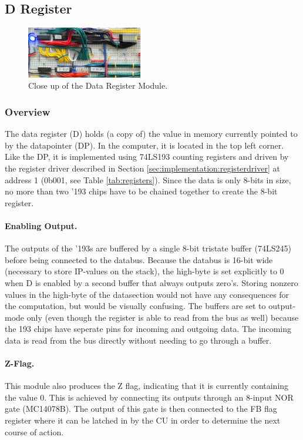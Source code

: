 
\subsection{D Register}
\begin{figure}[H]
  \centering
  \includegraphics[width=0.45\textwidth]{img/dregistercloseup}
  \caption{Close up of the Data Register Module.}
  \label{fig:dregcloseup}
\end{figure}

\subsubsection{Overview}
The data register (D) holds (a copy of) the value in memory currently pointed to by the datapointer (DP). In the computer, it is located in the top left corner. Like the DP, it is implemented using 74LS193 counting registers and driven by the register driver described in Section \ref{sec:implementation:registerdriver} at address 1 (0b001, see Table \ref{tab:registers}). Since the data is only 8-bits in size, no more than two '193 chips have to be chained together to create the 8-bit register. 

\paragraph{Enabling Output. } The outputs of the '193s are buffered by a single 8-bit tristate buffer (74LS245) before being connected to the databus. Because the databus is 16-bit wide (necessary to store IP-values on the stack), the high-byte is set explicitly to 0 when D is enabled by a second buffer that always outputs zero's. Storing nonzero values in the high-byte of the datasection would not have any consequences for the computation, but would be visually confusing. The buffers are set to output-mode only (even though the register is able to read from the bus as well) because the 193 chips have seperate pins for incoming and outgoing data. The incoming data is read from the bus directly without needing to go through a buffer.

\paragraph{Z-Flag.} This module also produces the Z flag, indicating that it is currently containing the value 0. This is achieved by connecting its outputs through an 8-input NOR gate (MC14078B). The output of this gate is then connected to the FB flag register where it can be latched in by the CU in order to determine the next course of action.

